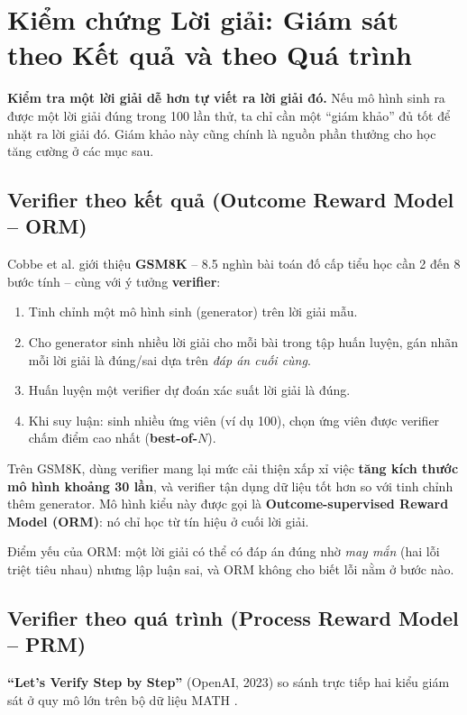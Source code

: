
\section{Kiểm chứng Lời giải: Giám sát theo Kết quả và theo Quá trình \newtag}
\label{sec:verifiers}

\begin{tcolorbox}[title={Trực giác cốt lõi}, colback=yellow!10!white, colframe=yellow!50!black, fonttitle=\bfseries]
\textbf{Kiểm tra một lời giải dễ hơn tự viết ra lời giải đó.} Nếu mô hình sinh ra được một lời giải đúng trong 100 lần thử, ta chỉ cần một “giám khảo” đủ tốt để nhặt ra lời giải đó. Giám khảo này cũng chính là nguồn phần thưởng cho học tăng cường ở các mục sau.
\end{tcolorbox}

\subsection{Verifier theo kết quả (Outcome Reward Model -- ORM)}
\label{ssec:orm}
Cobbe et al. \cite{cobbe2021gsm8k} giới thiệu \textbf{GSM8K} -- 8.5 nghìn bài toán đố cấp tiểu học cần 2 đến 8 bước tính -- cùng với ý tưởng \textbf{verifier}:
\begin{enumerate}
	\item Tinh chỉnh một mô hình sinh (generator) trên lời giải mẫu.
	\item Cho generator sinh nhiều lời giải cho mỗi bài trong tập huấn luyện, gán nhãn mỗi lời giải là đúng/sai dựa trên \emph{đáp án cuối cùng}.
	\item Huấn luyện một verifier dự đoán xác suất lời giải là đúng.
	\item Khi suy luận: sinh nhiều ứng viên (ví dụ 100), chọn ứng viên được verifier chấm điểm cao nhất (\textbf{best-of-$N$}).
\end{enumerate}
Trên GSM8K, dùng verifier mang lại mức cải thiện xấp xỉ việc \textbf{tăng kích thước mô hình khoảng 30 lần}, và verifier tận dụng dữ liệu tốt hơn so với tinh chỉnh thêm generator. Mô hình kiểu này được gọi là \textbf{Outcome-supervised Reward Model (ORM)}: nó chỉ học từ tín hiệu ở cuối lời giải.

Điểm yếu của ORM: một lời giải có thể có đáp án đúng nhờ \emph{may mắn} (hai lỗi triệt tiêu nhau) nhưng lập luận sai, và ORM không cho biết lỗi nằm ở bước nào.

\subsection{Verifier theo quá trình (Process Reward Model -- PRM)}
\label{ssec:prm}
\textbf{“Let's Verify Step by Step”} \cite{lightman2024verify} (OpenAI, 2023) so sánh trực tiếp hai kiểu giám sát ở quy mô lớn trên bộ dữ liệu MATH \cite{hendrycks2021math}.

